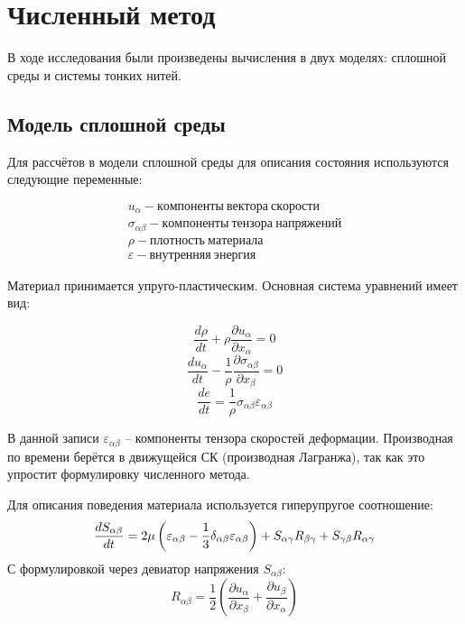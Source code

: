\chapter{Численный метод}\label{ch:numeric}
В ходе исследования были произведены вычисления в двух моделях: сплошной среды и системы тонких нитей.

\section{Модель сплошной среды}\label{sec:model-simple}
Для рассчётов в модели сплошной среды для описания состояния используются следующие переменные:

\begin{gather*}
    u_{\alpha} - компоненты~вектора~скорости \\
    \sigma_{\alpha\beta} - компоненты~тензора~напряжений \\
    \rho - плотность~материала \\
    \varepsilon - внутренняя~энергия
\end{gather*}

Материал принимается упруго-пластическим.
Основная система уравнений имеет вид:

\begin{equation}
    \frac{d\rho}{dt} + \rho \frac{\partial u_{\alpha}}{\partial x_{\alpha}} = 0
\end{equation}
\begin{equation}
    \frac{d u_{\alpha}}{dt} - \frac{1}{\rho} \frac{\partial \sigma_{\alpha \beta}}{\partial x_{\beta}} = 0
\end{equation}
\begin{equation}
    \frac{de}{dt} = \frac{1}{\rho} \sigma_{\alpha \beta} \varepsilon_{\alpha \beta}
\end{equation}

В данной записи $\varepsilon_{\alpha \beta}$ -- компоненты тензора скоростей деформации.
Производная по времени берётся в движущейся СК (производная Лагранжа), так как это упростит формулировку численного метода.

Для описания поведения материала используется гиперупругое соотношение:
\begin{equation}
    \frac{d S_{\alpha \beta}}{d t} = 2 \mu \left( \varepsilon_{\alpha \beta} - \\
    \frac{1}{3} \delta_{\alpha \beta} \varepsilon_{\alpha \beta} \right) + S_{\alpha \gamma} R_{\beta \gamma} + \\
    S_{\gamma \beta} R_{\alpha \gamma}
\end{equation}
С формулировкой через девиатор напряжения $S_{\alpha\beta}$:
\begin{equation}
    R_{\alpha \beta} = \frac{1}{2} \left( \frac{\partial u_{\alpha}}{\partial x_{\beta}} + \frac{\partial u_{\beta}}{\partial x_{\alpha}} \right)
\end{equation}

